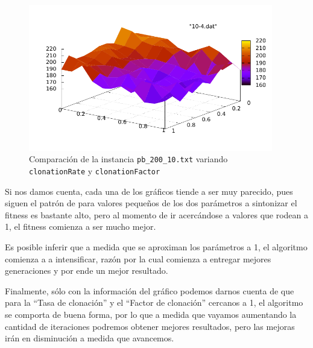 \newpage 
\begin{figure}[h!]
\begin{center}
	\includegraphics[width=0.95\textwidth]{img/10-4.pdf}
	\caption{Comparaci\'on de la instancia \texttt{pb\_200\_10.txt} variando \texttt{clonationRate} y \texttt{clonationFactor}}
	\label{fig:4-3}
\end{center}
\end{figure}

Si nos damos cuenta, cada una de los gráficos tiende a ser muy parecido,
pues siguen el patrón de para valores pequeños de los dos parámetros a sintonizar
el fitness es bastante alto, pero al momento de ir acercándose a valores que rodean a 1,
el fitness comienza a ser mucho mejor.

Es posible inferir que a medida que se aproximan los parámetros a 1, el algoritmo
comienza a a intensificar, razón por la cual comienza a entregar mejores generaciones y por ende
un mejor resultado.

Finalmente, sólo con la información del gráfico podemos darnos cuenta de que
para la ``Tasa de clonación'' y el ``Factor de clonación'' cercanos a 1,
el algoritmo se comporta de buena forma, por lo que a medida que vayamos aumentando
la cantidad de iteraciones podremos obtener mejores resultados, pero las mejoras
irán en disminución a medida que avancemos.

\newpage
%
%
